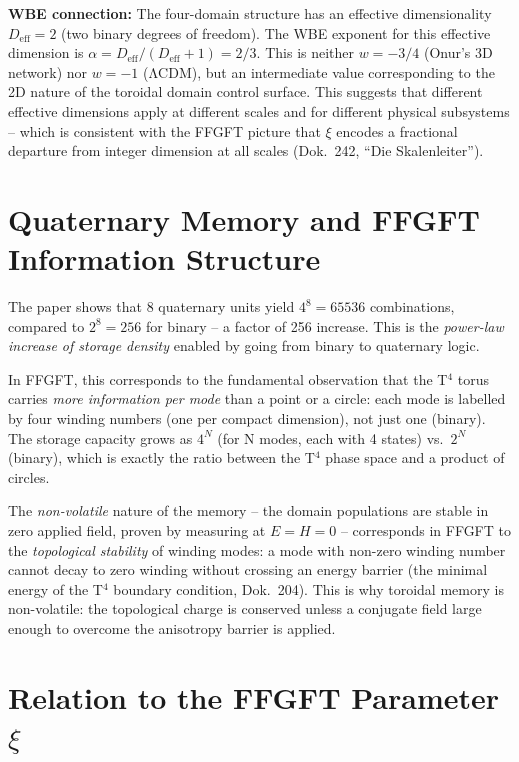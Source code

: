 \noindent\textbf{WBE connection:} The four-domain structure has an
effective dimensionality $D_{\mathrm{eff}} = 2$ (two binary degrees of
freedom). The WBE exponent for this effective dimension is
$\alpha = D_{\mathrm{eff}}/(D_{\mathrm{eff}}+1) = 2/3$. This is neither
$w=-3/4$ (Onur's 3D network) nor $w=-1$ (ΛCDM), but an intermediate value
corresponding to the 2D nature of the toroidal domain control surface.
This suggests that different effective dimensions apply at different scales
and for different physical subsystems -- which is consistent with the
FFGFT picture that $\xi$ encodes a fractional departure from integer
dimension at all scales (Dok.~242, ``Die Skalenleiter'').

\section{Quaternary Memory and FFGFT Information Structure}

The paper shows that 8 quaternary units yield $4^8 = 65536$ combinations,
compared to $2^8 = 256$ for binary -- a factor of 256 increase. This is
the \emph{power-law increase of storage density} enabled by going from
binary to quaternary logic.

In FFGFT, this corresponds to the fundamental observation that the T$^4$
torus carries \emph{more information per mode} than a point or a circle:
each mode is labelled by four winding numbers (one per compact dimension),
not just one (binary). The storage capacity grows as $4^N$ (for N modes,
each with 4 states) vs.\ $2^N$ (binary), which is exactly the ratio between
the T$^4$ phase space and a product of circles.

The \emph{non-volatile} nature of the memory -- the domain populations are
stable in zero applied field, proven by measuring at $E=H=0$ -- corresponds
in FFGFT to the \emph{topological stability} of winding modes: a mode with
non-zero winding number cannot decay to zero winding without crossing an
energy barrier (the minimal energy of the T$^4$ boundary condition,
Dok.~204). This is why toroidal memory is non-volatile: the topological
charge is conserved unless a conjugate field large enough to overcome the
anisotropy barrier is applied.

\section{Relation to the FFGFT Parameter $\xi$}

